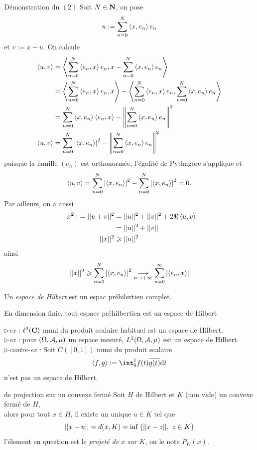 \documentclass[a4paper,11pt, twoside]{article}
\begin{document}
\begin{ProofC}{Démonstration du $(\mathit 2)$}
  Soit $N\in\mathbf N$, on pose 
  $$u:=\sum_{n=0}^N\left\langle x,e_n \right\rangle e_n$$
  et $v:=x-u.$ On calcule
  \begin{align*}
    \left\langle u,v \right\rangle&=\left\langle \sum_{n=0}^N\left\langle e_n,x \right\rangle e_n,x-\sum_{n=0}^N\left\langle x,e_n \right\rangle e_n \right\rangle\\
    &=\left\langle \sum_{n=0}^N\left\langle e_n,x \right\rangle e_n,x \right\rangle-\left\langle \sum_{n=0}^N\left\langle e_n,x \right\rangle e_n,\sum_{n=0}^N\left\langle x,e_n \right\rangle e_n \right\rangle\\
    &=\sum_{n=0}^N\left\langle x,e_n \right\rangle\left\langle e_n,x \right\rangle-\left\lVert\sum_{n=0}^N\left\langle x,e_n \right\rangle e_n\right\rVert^2\\
    \left\langle u,v \right\rangle&=\sum_{n=0}^N\left| \left\langle x,e_n \right\rangle\right|^2-\left\lVert\sum_{n=0}^N\left\langle x,e_n \right\rangle e_n\right\rVert^2
  \end{align*}
  puisque la famille $(e_n)$ est orthonormée, l'égalité de Pythagore s'applique et 
  $$\left\langle u,v \right\rangle=\sum_{n=0}^N\left| \left\langle x,e_n \right\rangle\right|^2-\sum_{n=0}^N\left| \left\langle x,e_n \right\rangle\right|^2=0.$$
  Par ailleurs, on a aussi
  \begin{align*}
    ||x^2||=||u+v||^2&=||u||^2+||v||^2+2\Re\left\langle u,v \right\rangle\\
    &=||u||^2+||v||\\
    ||x||^2&\geqslant ||u||^2
  \end{align*}
  ainsi 
  $$||x||^2\geqslant \sum_{n=0}^N\left| \left\langle x,e_n \right\rangle\right|^2\underset{n\to+\infty}{\longrightarrow} \sum_{n=0}^\infty\left| \left\langle e_n,x \right\rangle\right|$$
\end{ProofC}




\begin{Def}
  Un \emph{espace de Hilbert} est un espac préhilertien complet.
\end{Def}


\begin{RQ}
  En dimension finie, tout espace préhilbertien est un espace de Hilbert
\end{RQ}


$\triangleright$\emph{ex : }$\ell^2(\mathbf C)$ muni du produit scalaire habituel est un espace de Hilbert.\\


$\triangleright$\emph{ex : }pour $(\Omega,\mathcal A,\mu)$ un espace mesuré, $L^2(\Omega,\mathcal A,\mu)$ est un espace de Hilbert.\\


$\triangleright$\emph{contre-ex : }Soit $C([0,1])$ muni du produit scalaire 
$$\ps{f,g}:=\int_0^1f(t)\overline{g(t)}\dt$$
n'est pas un espace de Hilbert.


\begin{thC}{de projection sur un convexe fermé}
  Soit $H$ de Hilbert et $K$ (non vide) un convexe fermé de $H$,\\

  alors pour tout $x\in H$, il existe un unique $u\in K$ tel que 
  $$||x-u||=d(x,K)=\mathrm{inf}\left\{||x-z||,\ z\in K\right\}$$
  l'élement en question est le \emph{projeté de }$x$\emph{ sur }$K$, on le note $P_K(x).$
\end{thC}
\end{document}
